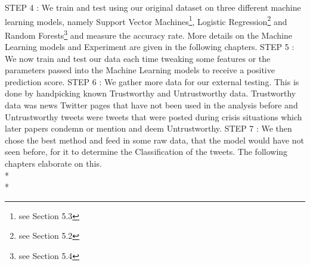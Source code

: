 STEP 4 :  We train and test using our original dataset on three different machine learning models, namely Support Vector Machines\footnote{see Section 5.3}, Logistic Regression\footnote{see Section 5.2} and Random Forests\footnote{see Section 5.4} and measure the accuracy rate. More details on the Machine Learning models and Experiment are given in the following chapters. 
STEP 5 : We now train and test our data each time tweaking some features or the parameters passed into the Machine Learning models to receive a positive prediction score. 
STEP 6 : We gather more data for our external testing. This is done by handpicking known Trustworthy and Untrustworthy data. Trustworthy data was news Twitter pages that have not been used in the analysis before and Untrustworthy tweets were tweets that were posted during crisis situations which later papers condemn or mention and deem Untrustworthy. 
STEP 7 : We then chose the best method and feed in some raw data, that the model would have not seen before, for it to determine the Classification of the tweets. The following chapters elaborate on this. \\*\\*
